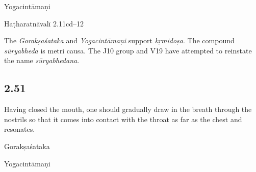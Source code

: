 \begin{ekdosis}
\begin{testimonia}[hp02_050]
Yogacintāmaṇi 
\begin{versinnote} 
\end{versinnote} 

Haṭharatnāvalī 2.11cd–12

\begin{versinnote}
\end{versinnote}
\end{testimonia}

\begin{philcomm}[hp02_050]
The \emph{Gorakṣaśataka} and \emph{Yogacintāmaṇi} support \emph{kṛmidoṣa}. The compound \emph{sūryabheda} is metri causa. The J10 group and V19 have attempted to reinstate the name \emph{sūryabhedana}.
\end{philcomm}

\subsection*{2.51}
\begin{translation}[hp02_051]
Having closed the mouth, one should gradually draw in the breath through the nostrils so that it comes into contact with the throat as far as the chest and resonates.\end{translation}

\begin{sources}[hp02_051]
Gorakṣaśataka

\begin{versinnote}
\end{versinnote}
\end{sources}

\begin{testimonia}[hp02_051]
Yogacintāmaṇi


\end{testimonia}
\end{ekdosis}
